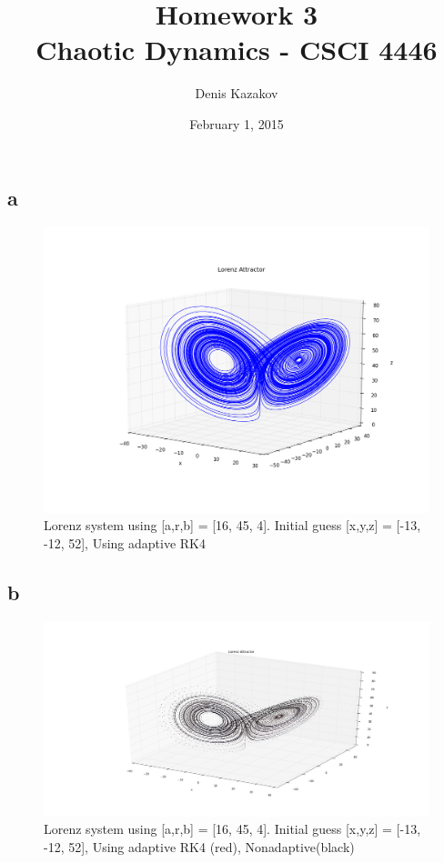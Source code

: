 \documentclass[12pt]{article}\pagestyle{myheadings}
\title{Homework 3 \\ Chaotic Dynamics - CSCI 4446}
\author{Denis Kazakov}
\date{February 1, 2015}
\theoremstyle{plain}
\begin{document}
\maketitle


\section{}


\section{}

\subsection{a}	
\begin{figure}[H]
\centering
\includegraphics[scale=.65]{2a}
\caption{Lorenz system using [a,r,b] = [16, 45, 4]. Initial guess [x,y,z] = [-13, -12, 52], Using adaptive RK4}
\label{fig:my_label}
\end{figure}

\subsection{b}	
\begin{figure}[H]
\centering
\includegraphics[scale=.45]{2b}
\caption{Lorenz system using [a,r,b] = [16, 45, 4]. Initial guess [x,y,z] = [-13, -12, 52], Using adaptive RK4 (red), Nonadaptive(black)}
\label{fig:my_label}
\end{figure}
\end{document}
